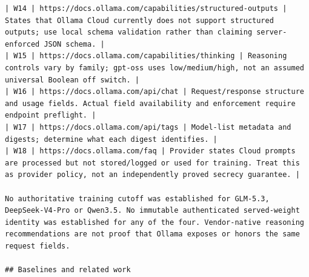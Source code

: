 \documentclass[11pt,a4paper]{article}
\begin{document}
\begin{verbatim}
| W14 | https://docs.ollama.com/capabilities/structured-outputs | States that Ollama Cloud currently does not support structured outputs; use local schema validation rather than claiming server-enforced JSON schema. |
| W15 | https://docs.ollama.com/capabilities/thinking | Reasoning controls vary by family; gpt-oss uses low/medium/high, not an assumed universal Boolean off switch. |
| W16 | https://docs.ollama.com/api/chat | Request/response structure and usage fields. Actual field availability and enforcement require endpoint preflight. |
| W17 | https://docs.ollama.com/api/tags | Model-list metadata and digests; determine what each digest identifies. |
| W18 | https://docs.ollama.com/faq | Provider states Cloud prompts are processed but not stored/logged or used for training. Treat this as provider policy, not an independently proved secrecy guarantee. |

No authoritative training cutoff was established for GLM-5.3, DeepSeek-V4-Pro or Qwen3.5. No immutable authenticated served-weight identity was established for any of the four. Vendor-native reasoning recommendations are not proof that Ollama exposes or honors the same request fields.

## Baselines and related work


\end{verbatim}
\end{document}
